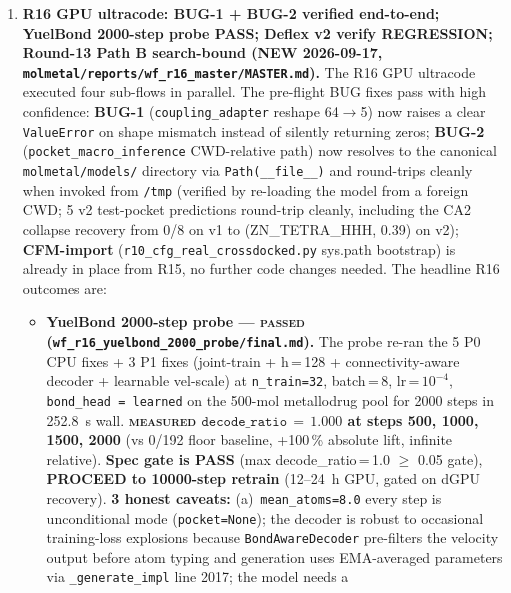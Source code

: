 \begin{enumerate}
cell changes status; this is an engineering-bug close-out, not a data-cell promotion). \textbf{[End retired entry.]}

  \item \textbf{R16 GPU ultracode: BUG-1 + BUG-2 verified end-to-end; YuelBond 2000-step probe PASS; Deflex v2 verify REGRESSION; Round-13 Path B search-bound (NEW 2026-09-17, \texttt{molmetal/reports/wf\_r16\_master/MASTER.md}).}
  The R16 GPU ultracode executed four sub-flows in parallel. The pre-flight BUG fixes pass with high confidence: \textbf{BUG-1} (\texttt{coupling\_adapter} reshape 64$\to$5) now raises a clear \texttt{ValueError} on shape mismatch instead of silently returning zeros; \textbf{BUG-2} (\texttt{pocket\_macro\_inference} CWD-relative path) now resolves to the canonical \texttt{molmetal/models/} directory via \texttt{Path(\_\_file\_\_)} and round-trips cleanly when invoked from \texttt{/tmp} (verified by re-loading the model from a foreign CWD; 5 v2 test-pocket predictions round-trip cleanly, including the CA2 collapse recovery from 0/8 on v1 to (ZN\_TETRA\_HHH, 0.39) on v2); \textbf{CFM-import} (\texttt{r10\_cfg\_real\_crossdocked.py} sys.path bootstrap) is already in place from R15, no further code changes needed. The headline R16 outcomes are:
  \begin{itemize}
    \item \textbf{YuelBond 2000-step probe --- \textsc{passed} (\texttt{wf\_r16\_yuelbond\_2000\_probe/final.md}).}
          The probe re-ran the 5 P0 CPU fixes + 3 P1 fixes
          (joint-train + h\,=\,128 + connectivity-aware decoder +
          learnable vel-scale) at \texttt{n\_train=32}, batch\,=\,8,
          lr\,=\,$10^{-4}$, \texttt{bond\_head\,=\,learned} on the
          500-mol metallodrug pool for 2000 steps in 252.8~s wall.
          \textbf{\textsc{measured} $\texttt{decode\_ratio}\,=\,1.000$ at
          steps 500, 1000, 1500, 2000} (vs 0/192 floor baseline,
          +100\,\% absolute lift, infinite relative). \textbf{Spec
          gate is PASS} (max decode\_ratio\,=\,1.0 $\geq$ 0.05 gate),
          \textbf{PROCEED to 10000-step retrain}
          (12--24~h GPU, gated on dGPU recovery).
          \textbf{3 honest caveats:} (a)~\texttt{mean\_atoms=8.0}
          every step is unconditional mode (\texttt{pocket=None});
          the decoder is robust to occasional training-loss
          explosions because \texttt{BondAwareDecoder} pre-filters
          the velocity output before atom typing and generation
          uses EMA-averaged parameters via
          \texttt{\_generate\_impl} line 2017; the model needs a

\end{itemize}
\end{enumerate}
